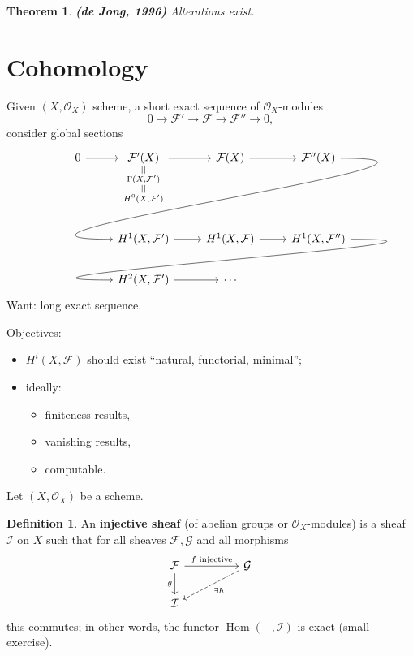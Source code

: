 \documentclass[12pt]{article}
\DeclareMathOperator{\Hom}{Hom}
\newtheorem*{theorem}{Theorem}
\theoremstyle{definition}
\newtheorem*{definition}{Definition}
\theoremstyle{remark}
\begin{document}
\begin{theorem}
\emph{\textbf{(de Jong, 1996)}} Alterations exist.
\end{theorem}

\section{Cohomology}
Given $(X,\mathcal{O}_X)$ scheme, a short exact sequence of $\mathcal{O}_X$-modules
\[0\longrightarrow\mathcal{F}'\longrightarrow\mathcal{F}\longrightarrow\mathcal{F}''\longrightarrow0,\]
consider global sections
\[
\begin{tikzcd}
0\arrow[r]&\underset{\substack{||\\\Gamma(X,\mathcal{F}')\\||\\H^0(X,\mathcal{F}')}}{\mathcal{F}'(X)}\arrow[r]&\mathcal{F}(X)\arrow[r]&\mathcal{F}''(X)\arrow[out=0,in=180,looseness=2,overlay,lld]\\
&H^1(X,\mathcal{F}')\arrow[r]&H^1(X,\mathcal{F})\arrow[r]&H^1(X,\mathcal{F}'')\arrow[out=0,in=180, looseness=2,overlay,lld]\\
&H^2(X,\mathcal{F}')\arrow[r]&\cdots
\end{tikzcd}
\]
Want: long exact sequence.

Objectives:
\begin{itemize}[label=$-$]
\item $H^i(X,\mathcal{F})$ should exist ``natural, functorial, minimal'';
\item ideally:
\begin{itemize}[label=$-$]
\item finiteness results,
\item vanishing results,
\item computable.
\end{itemize}
\end{itemize}

Let $(X,\mathcal{O}_X)$ be a scheme.

\begin{definition}
An \textbf{injective sheaf} (of abelian groups or $\mathcal{O}_X$-modules) is a sheaf $\mathcal{I}$ on $X$ such that for all sheaves $\mathcal{F},\mathcal{G}$ and all morphisms
\[
\begin{tikzcd}
\mathcal{F}\arrow[rr,"f\text{ injective}"]\arrow[d,"g",swap]&&\mathcal{G}\arrow[lld,dashed,"\exists h"]\\
\mathcal{I}
\end{tikzcd}
\]
this commutes; in other words, the functor $\Hom(-,\mathcal{I})$ is exact (small exercise).
\end{definition}
\end{document}
